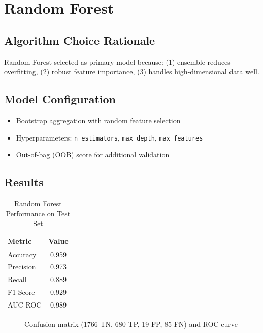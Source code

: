 \section{Random Forest}

\subsection*{Algorithm Choice Rationale}
Random Forest selected as primary model because: (1) ensemble reduces overfitting, (2) robust feature importance, (3) handles high-dimensional data well.

\subsection*{Model Configuration}
\begin{itemize}
    \item Bootstrap aggregation with random feature selection
    \item Hyperparameters: \texttt{n\_estimators}, \texttt{max\_depth}, \texttt{max\_features}
    \item Out-of-bag (OOB) score for additional validation
\end{itemize}

\subsection*{Results}
\begin{table}[H]
\centering
\caption{Random Forest Performance on Test Set}
\label{tab:rf_performance}
\begin{tabular}{|l|c|}
\hline
\textbf{Metric} & \textbf{Value} \\
\hline
Accuracy & 0.959 \\
Precision & 0.973 \\
Recall & 0.889 \\
F1-Score & 0.929 \\
AUC-ROC & 0.989 \\
\hline
\end{tabular}
\end{table}

\begin{figure}[H]
    \centering
    \caption{Confusion matrix (1766 TN, 680 TP, 19 FP, 85 FN) and ROC curve}
    \label{fig:rf_results}
\end{figure}

